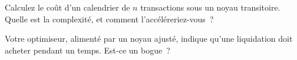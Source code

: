 \begin{interviewq}\label{iq:mx:transient-impact-and-propagator-models:5}
Calculez le coût d'un calendrier de $n$ transactions sous un noyau transitoire. Quelle est la complexité, et comment l'accéléreriez-vous~?
\end{interviewq}

\begin{interviewq}\label{iq:mx:transient-impact-and-propagator-models:6}
Votre optimiseur, alimenté par un noyau ajusté, indique qu'une liquidation doit acheter pendant un temps. Est-ce un bogue~?
\end{interviewq}
